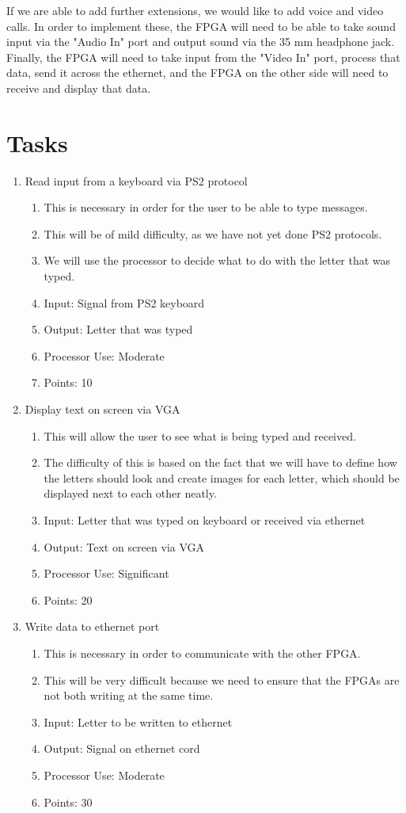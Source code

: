 \documentclass[letterpaper]{article}
\begin{document}
If we are able to add further extensions, we would like to add voice and video calls. In order to implement these, the FPGA will need to be able to take sound input via the "Audio In" port and output sound via the 35 mm headphone jack. Finally, the FPGA will need to take input from the "Video In" port, process that data, send it across the ethernet, and the FPGA on the other side will need to receive and display that data.

\section{Tasks}
\begin{enumerate}
\item Read input from a keyboard via PS2 protocol
\begin{enumerate}
\item This is necessary in order for the user to be able to type messages.
\item This will be of mild difficulty, as we have not yet done PS2 protocols.
\item We will use the processor to decide what to do with the letter that was typed.
\item Input: Signal from PS2 keyboard
\item Output: Letter that was typed
\item Processor Use: Moderate
\item Points: 10
\end{enumerate}

\item Display text on screen via VGA
\begin{enumerate}
\item This will allow the user to see what is being typed and received.
\item The difficulty of this is based on the fact that we will have to define how the letters should look and create images for each letter, which should be displayed next to each other neatly.
\item Input: Letter that was typed on keyboard or received via ethernet
\item Output: Text on screen via VGA
\item Processor Use: Significant
\item Points: 20
\end{enumerate}

\item Write data to ethernet port
\begin{enumerate}
\item This is necessary in order to communicate with the other FPGA.
\item This will be very difficult because we need to ensure that the FPGAs are not both writing at the same time.
\item Input: Letter to be written to ethernet
\item Output: Signal on ethernet cord
\item Processor Use: Moderate
\item Points: 30
\end{enumerate}


\end{enumerate}
\end{document}
